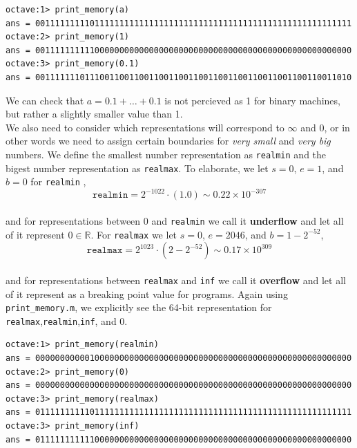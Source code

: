 \documentclass[paper=a4, fontsize=11pt]{scrartcl}
\begin{document}
\begin{verbatim}
octave:1> print_memory(a)
ans = 0011111111101111111111111111111111111111111111111111111111111111
octave:2> print_memory(1)
ans = 0011111111110000000000000000000000000000000000000000000000000000
octave:3> print_memory(0.1)
ans = 0011111110111001100110011001100110011001100110011001100110011010
\end{verbatim}

We can check that $a=0.1 + \dots + 0.1$ is not percieved as 1 for binary machines, but rather a slightly smaller value than 1.  \\
 
We also need to consider which representations will correspond to $\infty$ and $0$, or in other words we need to assign certain boundaries for \textit{very small} and \textit{very big} numbers. We define the smallest number representation as \texttt{realmin} and the bigest number representation as \texttt{realmax}. To elaborate, we let $s=0$, $e=1$, and $b=0$ for \texttt{realmin} ,\\

\begin{equation}\nonumber
	\texttt{realmin} = 2^{-1022} \cdot (1.0) \sim 0.22 \times 10^{-307}
\end{equation}\\

and for representations between 0 and \texttt{realmin} we call it \textbf{underflow} and let all of it represent $0 \in \mathbb{R}$. For \texttt{realmax} we let $s=0$, $e=2046$, and $b=1-2^{-52}$,\\

\begin{equation}\nonumber
	\texttt{realmax} = 2^{1023} \cdot (2 - 2^{-52}) \sim 0.17 \times 10^{309}
\end{equation}\\

and for representations between \texttt{realmax} and \texttt{inf} we call it \textbf{overflow} and let all of it represent as a breaking point value for programs. Again using \texttt{print\_memory.m}, we explicitly see the 64-bit representation for \texttt{realmax},\texttt{realmin},\texttt{inf}, and 0.

\vspace{0.15in}
\begin{verbatim}
octave:1> print_memory(realmin)
ans = 0000000000010000000000000000000000000000000000000000000000000000
octave:2> print_memory(0)
ans = 0000000000000000000000000000000000000000000000000000000000000000
octave:3> print_memory(realmax)
ans = 0111111111101111111111111111111111111111111111111111111111111111
octave:3> print_memory(inf)
ans = 0111111111110000000000000000000000000000000000000000000000000000
\end{verbatim}
\vspace{0.15in}
\end{document}
